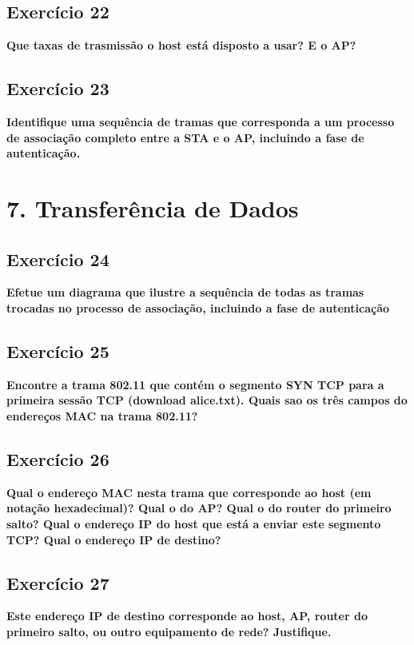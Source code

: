 \documentclass[a4paper]{report}
\begin{document}
\section{Exercício 22}
\textbf{Que taxas de trasmissão o host está disposto a usar? E o AP?}\\

\section{Exercício 23}
\textbf{Identifique uma sequência de tramas que corresponda a um processo de
    associação completo entre a STA e o AP, incluindo a fase de autenticação.}\\

\chapter{7. Transferência de Dados}
\section{Exercício 24}
\textbf{Efetue um diagrama que ilustre a sequência de todas as tramas trocadas
    no processo de associação, incluindo a fase de autenticação}\\

\section{Exercício 25}
\textbf{Encontre a trama 802.11 que contém o segmento SYN TCP para a primeira
    sessão TCP (download alice.txt). Quais sao os três campos do endereços MAC
    na trama 802.11?}\\

\section{Exercício 26}
\textbf{Qual o endereço MAC nesta trama que corresponde ao host (em notação
    hexadecimal)? Qual o do AP? Qual o do router do primeiro salto? Qual o
    endereço IP do host que está a enviar este segmento TCP? Qual o endereço IP
    de destino?}\\

\section{Exercício 27}
\textbf{Este endereço IP de destino corresponde ao host, AP, router do primeiro
    salto, ou outro equipamento de rede? Justifique.}\\
\end{document}
